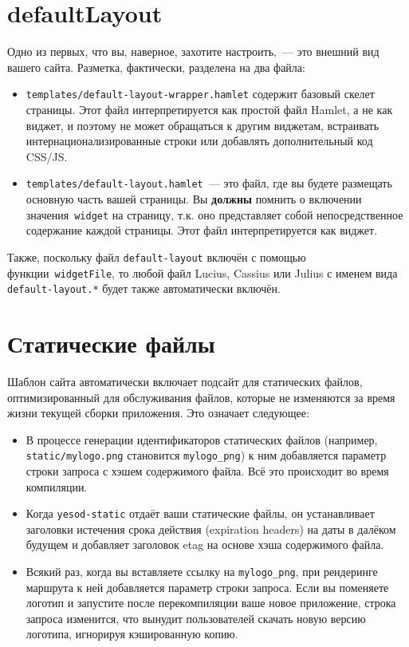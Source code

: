 \section{defaultLayout}
Одно из первых, что вы, наверное, захотите настроить,~--- это внешний вид вашего
сайта. Разметка, фактически, разделена на два файла:
\begin{itemize}
  \item \texttt{templates/default-layout-wrapper.hamlet} содержит базовый скелет
      страницы. Этот файл интерпретируется как простой файл Hamlet, а не как
      виджет, и поэтому не может обращаться к другим виджетам, встраивать
      интернационализированные строки или добавлять дополнительный код CSS/JS.
  \item \texttt{templates/default-layout.hamlet}~--- это файл, где вы будете
      размещать основную часть вашей страницы. Вы \textbf{должны} помнить о
      включении значения~\lstinline!widget! на страницу, т.к. оно представляет
      собой непосредственное содержание каждой страницы. Этот файл
      интерпретируется как виджет.
\end{itemize}

Также, поскольку файл \texttt{default-layout} включён с помощью
функции~\lstinline!widgetFile!, то любой файл Lucius, Cassius или Julius с
именем вида \texttt{default-layout.*} будет также автоматически включён.

\section{Статические файлы}
Шаблон сайта автоматически включает подсайт для статических файлов,
оптимизированный для обслуживания файлов, которые не изменяются за время жизни
текущей сборки приложения. Это означает следующее:
\begin{itemize}
  \item В процессе генерации идентификаторов статических файлов (например,
      \texttt{static/mylogo.png} становится \lstinline!mylogo_png!) к ним
      добавляется параметр строки запроса с хэшем содержимого файла. Всё
      это происходит во время компиляции.
  \item Когда \lstinline!yesod-static! отдаёт ваши статические файлы, он устанавливает
      заголовки истечения срока действия (expiration headers) на даты в далёком
      будущем и добавляет заголовок etag на основе хэша содержимого файла.
  \item Всякий раз, когда вы вставляете ссылку на \lstinline!mylogo_png!, при
      рендеринге маршрута к ней добавляется параметр строки запроса. Если вы
      поменяете логотип и запустите после перекомпиляции ваше новое приложение,
      строка запроса изменится, что вынудит пользователей скачать новую версию
      логотипа, игнорируя кэшированную копию.
\end{itemize}


